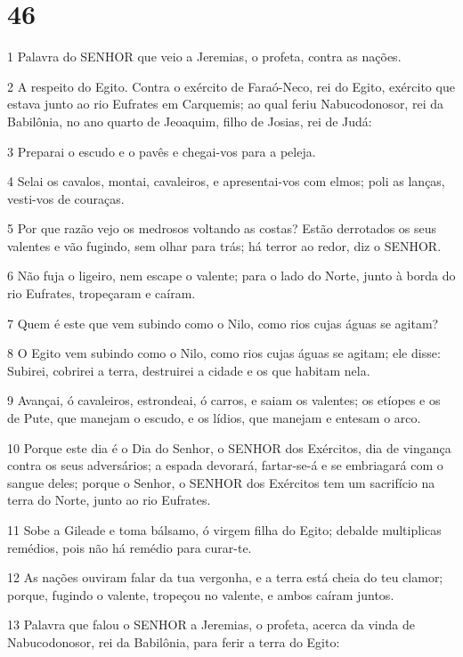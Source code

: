 \chapter{46}

\par 1 Palavra do SENHOR que veio a Jeremias, o profeta, contra as nações.
\par 2 A respeito do Egito. Contra o exército de Faraó-Neco, rei do Egito, exército que estava junto ao rio Eufrates em Carquemis; ao qual feriu Nabucodonosor, rei da Babilônia, no ano quarto de Jeoaquim, filho de Josias, rei de Judá:
\par 3 Preparai o escudo e o pavês e chegai-vos para a peleja.
\par 4 Selai os cavalos, montai, cavaleiros, e apresentai-vos com elmos; poli as lanças, vesti-vos de couraças.
\par 5 Por que razão vejo os medrosos voltando as costas? Estão derrotados os seus valentes e vão fugindo, sem olhar para trás; há terror ao redor, diz o SENHOR.
\par 6 Não fuja o ligeiro, nem escape o valente; para o lado do Norte, junto à borda do rio Eufrates, tropeçaram e caíram.
\par 7 Quem é este que vem subindo como o Nilo, como rios cujas águas se agitam?
\par 8 O Egito vem subindo como o Nilo, como rios cujas águas se agitam; ele disse: Subirei, cobrirei a terra, destruirei a cidade e os que habitam nela.
\par 9 Avançai, ó cavaleiros, estrondeai, ó carros, e saiam os valentes; os etíopes e os de Pute, que manejam o escudo, e os lídios, que manejam e entesam o arco.
\par 10 Porque este dia é o Dia do Senhor, o SENHOR dos Exércitos, dia de vingança contra os seus adversários; a espada devorará, fartar-se-á e se embriagará com o sangue deles; porque o Senhor, o SENHOR dos Exércitos tem um sacrifício na terra do Norte, junto ao rio Eufrates.
\par 11 Sobe a Gileade e toma bálsamo, ó virgem filha do Egito; debalde multiplicas remédios, pois não há remédio para curar-te.
\par 12 As nações ouviram falar da tua vergonha, e a terra está cheia do teu clamor; porque, fugindo o valente, tropeçou no valente, e ambos caíram juntos.
\par 13 Palavra que falou o SENHOR a Jeremias, o profeta, acerca da vinda de Nabucodonosor, rei da Babilônia, para ferir a terra do Egito:
